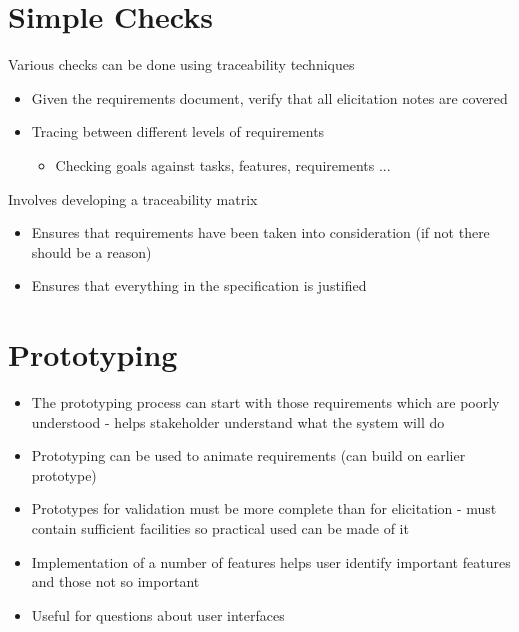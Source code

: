 \documentclass{article}[18pt]
\begin{document}
\section{Simple Checks}
Various checks can be done using traceability techniques
\begin{itemize}
	\item Given the requirements document, verify that all elicitation notes are covered
	\item Tracing between different levels of requirements
	\begin{itemize}
		\item Checking goals against tasks, features, requirements ...
	\end{itemize}
\end{itemize}
Involves developing a traceability matrix
\begin{itemize}
	\item Ensures that requirements have been taken into consideration (if not there should be a reason)
	\item Ensures that everything in the specification is justified
\end{itemize}
\section{Prototyping}
\begin{itemize}
	\item The prototyping process can start with those requirements which are poorly understood - helps stakeholder understand what the system will do
	\item Prototyping can be used to animate requirements (can build on earlier prototype)
	\item Prototypes for validation must be more complete than for elicitation - must contain sufficient facilities so practical used can be made of it
	\item Implementation of a number of features helps user identify important features and those not so important
	\item Useful for questions about user interfaces
\end{itemize}
\end{document}
